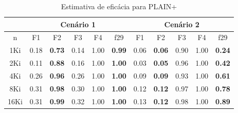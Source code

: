 \begin{table}[ht]
    \tiny
    \centering
    \caption{Estimativa de eficácia para PLAIN+\label{plus-plain-effect}}
    \begin{tabular}{c|ccccc|ccccc}
        \toprule
        & \multicolumn{5}{c}{Cenário 1} & \multicolumn{5}{c}{Cenário 2} \\
        \midrule
        n        & F1   & F2            & F3   & F4   & f29           & F1   & F2            & F3   & F4   & f29  \\
        \midrule
        1Ki      & 0.18 & \textbf{0.73} & 0.14 & 1.00 & \textbf{0.99} & 0.06 & \textbf{0.06} & 0.90 & 1.00 & \textbf{0.24} \\
        2Ki      & 0.11 & \textbf{0.88} & 0.16 & 1.00 & \textbf{1.00} & 0.03 & \textbf{0.05} & 0.96 & 1.00 & \textbf{0.42} \\
        4Ki      & 0.26 & \textbf{0.96} & 0.26 & 1.00 & \textbf{1.00} & 0.09 & \textbf{0.09} & 0.93 & 1.00 & \textbf{0.61} \\
        8Ki      & 0.31 & \textbf{0.98} & 0.30 & 1.00 & \textbf{1.00} & 0.12 & \textbf{0.12} & 0.97 & 1.00 & \textbf{0.78} \\
        16Ki     & 0.31 & \textbf{0.99} & 0.32 & 1.00 & \textbf{1.00} & 0.13 & \textbf{0.12} & 0.98 & 1.00 & \textbf{0.89} \\
        \bottomrule
    \end{tabular}
\end{table}
